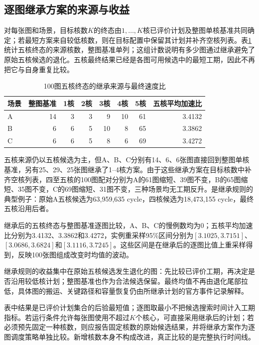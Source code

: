 \subsection{逐图继承方案的来源与收益}
对每张图和场景，目标核数$K$的终态由$1,\ldots,K$核已评价计划及整图单核基准共同确定；若最短方案来自较低核数，则在目标配置中保留其计划并补齐空核列表。表\ref{tab:best-core-choice}统计五核终态的来源核数，整图基准单列；这组计数说明有多少图通过继承避免了原始五核候选的退化。五核最终结果已经是各图可用候选中的最短工期，因此不再把它与自身重复比较。
\begin{table}[H]\centering\small
\caption{100图五核终态的继承来源与最终速度比}\label{tab:best-core-choice}
\begin{tabular}{lrrrrrrr}\toprule
场景 & 整图基准 & 1核 & 2核 & 3核 & 4核 & 5核 & 五核平均加速比\\\midrule
A & 14 & 3 & 3 & 9 & 10 & 61 & 3.4132\\
B & 6 & 6 & 5 & 10 & 8 & 65 & 3.3862\\
C & 6 & 6 & 5 & 8 & 6 & 69 & 3.4272\\\bottomrule
\end{tabular}\end{table}

五核来源仍以五核候选为主，但A、B、C分别有14、6、6张图直接回到整图单核基准，另有25、29、25张图继承了1--4核方案。由于这些继承方案在目标核数中补齐空核列表，四至五核的100图配对分别为A的61图缩短、39图不变，B的65图缩短、35图不变，C的69图缩短、31图不变，三种场景均无工期反升。是继承规则的典型例子：原始A五核候选为63,959,635 cycle，四核候选为18,473,155 cycle，最终五核沿用后者。

继承后的五核终态与整图基准逐图比较，A、B、C的慢例数均为0；五核平均加速比分别为3.4132、3.3862和3.4272，实例重采样95\%区间分别为$[3.1025,3.7151]$、$[3.0686,3.6824]$和$[3.1116,3.7245]$。这些区间是在继承后的逐图比值上重采样得到，反映100张图组成改变时均值的波动。

继承规则的收益集中在原始五核候选发生退化的图：先比较已评价工期，再决定是否沿用较低核计划；整图基准也作为合法候选保留。最终均值不再由退化尾部拉低，具体图的搬运、关键路径和容量恢复仍由所继承计划的官方事件记录解释。

表中结果是已评价计划集合的后验最短值；逐图取最小不把候选搜索时间计入工期指标。若运行条件允许每张图使用不超过$K$个核心，可直接采用继承后的计划；若必须预先固定一种核数，则应报告固定核数的原始候选结果，并将继承方案作为逐图调度策略单独比较。新增核数本身不构成改进，真正比较的是完整执行时间线。


